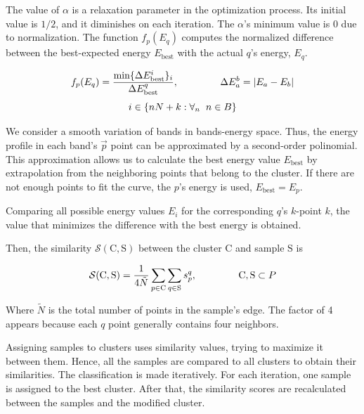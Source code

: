 \documentclass[a4paper,12pt]{report}
\begin{document}
\begin{appendices}
The value of $\alpha$ is a relaxation parameter in the optimization process.
Its initial value is $1/2$, and it diminishes on each iteration.
The $\alpha$'s minimum value is $0$ due to normalization.
The function $f_p(E_q)$ computes the normalized difference between the best-expected energy $E_{\text{best}}$ with the actual $q$'s energy, $E_q$.

\begin{equation}
    f_p(E_q) = \frac{\text{min}\{\Delta E_\text{best}^{i}\}_i}{\Delta E_\text{best}^q},\hspace{1.5cm} \Delta E_a^b = |E_a-E_b|
\end{equation}
\begin{equation}
    i \in \left\{n N + k: \forall_n\hspace{0.2cm}n\in B\right\}
\end{equation}

We consider a smooth variation of bands in bands-energy space. Thus, the energy profile in each band's $\vec{p}$ point can be approximated by a second-order polinomial. This approximation allows us to calculate the best energy value $E_\text{best}$ by extrapolation from the neighboring points that belong to the cluster.
If there are not enough points to fit the curve, the $p$'s energy is used,  $E_\text{best}=E_p$.

Comparing all possible energy values $E_i$ for the corresponding $q$'s $k$-point $k$, the value that minimizes the difference with the best energy is obtained.




Then, the similarity $\mathcal{S}(\mathrm{C},\mathrm{S})$ between the cluster $\mathrm{C}$ and sample $\mathrm{S}$  is

\begin{equation}
    \mathcal{S}(\mathrm{C},\mathrm{S}) = \frac{1}{4\tilde{N}}\sum_{p\in \mathrm{C}}\sum_{q\in\mathrm{S}} s_p^q,\hspace{1.5cm}\mathrm{C},\mathrm{S}\subset P
\end{equation}

Where $\tilde{N}$ is the total number of points in the sample's edge. The factor of 4 appears because each $q$ point generally contains four neighbors.

Assigning samples to clusters uses similarity values, trying to maximize it between them.
Hence, all the samples are compared to all clusters to obtain their similarities. The classification is made iteratively. For each iteration, one sample is assigned to the best cluster. After that, the similarity scores are recalculated between the samples and the modified cluster.


\end{appendices}
\end{document}
